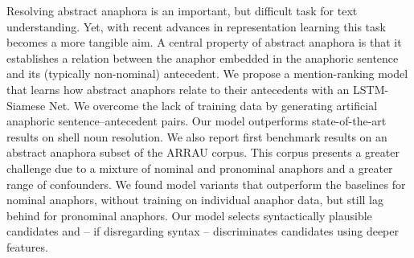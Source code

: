 Resolving abstract anaphora is an important, but difficult task for text understanding. Yet, with recent advances in representation learning this task becomes a more tangible aim. A central property of abstract anaphora is that it establishes a relation between the anaphor embedded in the anaphoric sentence and its (typically non-nominal) antecedent. We propose a mention-ranking model that learns how abstract anaphors relate to their antecedents with an LSTM-Siamese Net. We overcome the lack of training data by generating artificial anaphoric sentence--antecedent pairs. Our model outperforms state-of-the-art results on shell noun resolution. We  also report first benchmark results on an abstract anaphora subset of the ARRAU corpus. This corpus presents a greater challenge due to a mixture of nominal and pronominal anaphors and a greater range of confounders. We found model variants that outperform the baselines for nominal anaphors, without training on individual anaphor data, but still lag behind for pronominal anaphors. Our model selects syntactically plausible candidates and -- if disregarding syntax -- discriminates candidates using deeper features.
